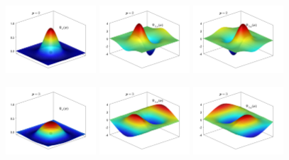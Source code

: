 \begin{figure}[H]
\centering
\begin{subcaptiongroup}
\includegraphics[width=0.3\textwidth]{figure/nomesh/Qd1.png}
\label{shape}
\includegraphics[width=0.3\textwidth]{figure/nomesh/Qd2.png}
\label{dshape}
\includegraphics[width=0.3\textwidth]{figure/nomesh/Qd3.png}
\label{dshape}
\label{dshape}
\end{subcaptiongroup}
\begin{subcaptiongroup}
\includegraphics[width=0.3\textwidth]{figure/nomesh/C1.png}
\label{shape}
\includegraphics[width=0.3\textwidth]{figure/nomesh/C2.png}
\label{dshape}
\includegraphics[width=0.3\textwidth]{figure/nomesh/C3.png}

\end{subcaptiongroup}
\end{figure}
